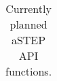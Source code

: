 \begin{table}[!ht]
\begin{tabular}{ll}
	\end{tabular}
	\caption{Currently planned aSTEP API functions.}
	\label{tbl:s3api}
\end{table}